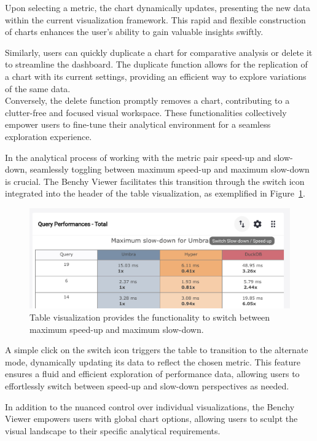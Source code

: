 Upon selecting a metric, the chart dynamically updates, presenting the new data within the current visualization framework. This rapid and flexible construction of charts enhances the user's ability to gain valuable insights swiftly.

Similarly, users can quickly duplicate a chart for comparative analysis or delete it to streamline the dashboard. The duplicate function allows for the replication of a chart with its current settings, providing an efficient way to explore variations of the same data.\\
Conversely, the delete function promptly removes a chart, contributing to a clutter-free and focused visual workspace. These functionalities collectively empower users to fine-tune their analytical environment for a seamless exploration experience.

In the analytical process of working with the metric pair speed-up and slow-down, seamlessly toggling between maximum speed-up and maximum slow-down is crucial. The Benchy Viewer facilitates this transition through the switch icon integrated into the header of the table visualization, as exemplified in Figure~\ref{fig:chart-configuration-table-switch}.

\begin{figure}[h]
  \centering
  \includegraphics[width=0.8\linewidth]{figures/chart-configuration-table-switch.png}
  \caption{Table visualization provides the functionality to switch between maximum speed-up and maximum slow-down.}
  \label{fig:chart-configuration-table-switch}
\end{figure}

A simple click on the switch icon triggers the table to transition to the alternate mode, dynamically updating its data to reflect the chosen metric. This feature ensures a fluid and efficient exploration of performance data, allowing users to effortlessly switch between speed-up and slow-down perspectives as needed.


In addition to the nuanced control over individual visualizations, the Benchy Viewer empowers users with global chart options, allowing users to sculpt the visual landscape to their specific analytical requirements.

